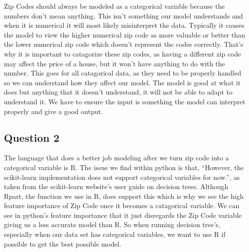 \documentclass[
  letterpaper,
  DIV=11,
  numbers=noendperiod]{scrartcl}
\begin{document}
\begin{tcolorbox}
Zip Codes should always be modeled as a categorical variable because the
numbers don't mean anything. This isn't something our model understands
and when it is numerical it will most likely misinterpret the data.
Typically it causes the model to view the higher numerical zip code as
more valuable or better than the lower numerical zip code which doesn't
represent the codes correctly. That's why it is important to catagorize
these zip codes, as having a different zip code may affect the price of
a house, but it won't have anything to do with the number. This goes for
all catagorical data, as they need to be properly handled so we can
understand how they affect our model. The model is good at what it does
but anything that it doesn't understand, it will not be able to adapt to
understand it. We have to ensure the input is something the model can
interpret properly and give a good output.

\subsection{Question 2}\label{sec-question-2}

The language that does a better job modeling after we turn zip code into
a categorical variable is R. The issue we find within python is that,
``However, the scikit-learn implementation does not support categorical
variables for now.'', as taken from the scikit-learn website's user
guide on decision trees. Although Rpart, the function we use in R, does
support this which is why we see the high feature importance of Zip Code
once it becomes a catagorical variable. We can see in python's feature
importance that it just disregards the Zip Code variable giving us a
less accurate model than R. So when running decision tree's, especially
when our data set has categorical variables, we want to use R if
possible to get the best possible model.

\end{tcolorbox}
\end{document}

